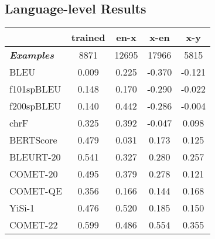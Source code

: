 \documentclass[11pt]{article}
\begin{document}
\subsection{Language-level Results}
\begin{table}[ht]
\small
\centering
\setlength{\tabcolsep}{1.5pt}
\setlength{\fboxsep}{0.5pt} \begin{tabular}{@{}lcccc@{}}
\toprule
                    & \textbf{trained} & \textbf{en-x} & \textbf{x-en} & \textbf{x-y}         \\
\midrule
\textit{\textbf{Examples}}          & 8871  & 12695                   & 17966                   & 5815                    \\ \midrule
BLEU                    & \phantom{-}0.009 & \phantom{-}0.225                   & -0.370                  & -0.121                  \\
f101spBLEU              & \phantom{-}0.148  & \phantom{-}0.170                   & -0.290                  & -0.022                  \\
f200spBLEU              & \phantom{-}0.140  & \phantom{-}0.442                   & -0.286                  & -0.004                  \\
chrF                    & \phantom{-}0.325  & \phantom{-}0.392                   & -0.047                  & \phantom{-}0.098                   \\
BERTScore               & \phantom{-}0.479  & \phantom{-}0.031                   & \phantom{-}0.173                   & \phantom{-}0.125                   \\
BLEURT-20               & \phantom{-}0.541  & \phantom{-}0.327                   & \phantom{-}0.280                   & \phantom{-}0.257                   \\
COMET-20                & \phantom{-}0.495  & \phantom{-}0.379                   & \phantom{-}0.278                   & \phantom{-}0.121                   \\
COMET-QE 			    & \phantom{-}0.356  & \phantom{-}0.166                   & \phantom{-}0.144                   & \phantom{-}0.168                   \\
YiSi-1                  & \phantom{-}0.476  & \phantom{-}0.520                   & \phantom{-}0.185                   & \phantom{-}0.150                   \\ \midrule
COMET-22                & \phantom{-}0.599  & \phantom{-}0.486                   & \phantom{-}0.554                   & \phantom{-}0.355                   \\

\end{tabular}
\end{table}
\end{document}
